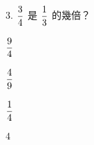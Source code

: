 \documentclass[12pt]{article}
\begin{document}
\begin{problem}
  \item[3.] $\fraction{3}{4}$ 是 $\fraction{1}{3}$ 的幾倍？
  \begin{choices}
    \item $\fraction{9}{4}$
    \item $\fraction{4}{9}$
    \item $\fraction{1}{4}$
    \item $4$
  \end{choices}
\end{problem}
\end{document}
